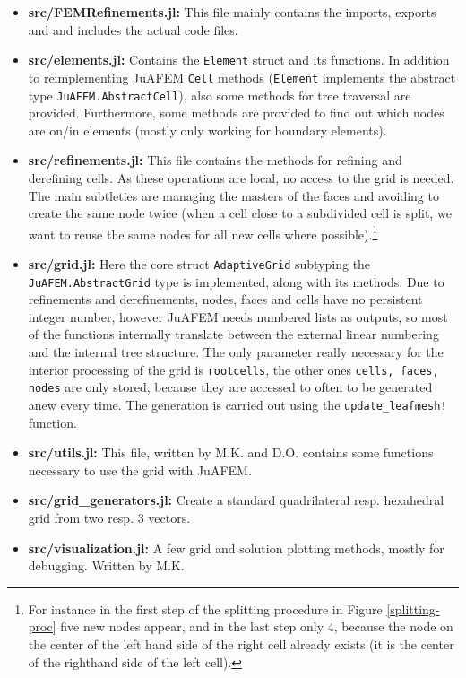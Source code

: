\documentclass{article}
\begin{document}
\begin{itemize}
    \item {\bf src/FEMRefinements.jl:} This file mainly contains the imports, exports and and includes the actual code files. 
    \item {\bf src/elements.jl:} Contains the \texttt{Element} struct and its functions. In addition to reimplementing JuAFEM \texttt{Cell} methods (\texttt{Element} implements the abstract type \texttt{JuAFEM.AbstractCell}), also some methods for tree traversal are provided. Furthermore, some methods are provided to find out which nodes are on/in elements (mostly only working for boundary elements).
    \item {\bf src/refinements.jl:} This file contains the methods for refining and derefining cells. As these operations are local, no access to the grid is needed. The main subtleties are managing the masters of the faces and avoiding to create the same node twice (when a cell close to a subdivided cell is split, we want to reuse the same nodes for all new cells where possible).\footnote{For instance in the first step of the splitting procedure in Figure \ref{splitting-proc} five new nodes appear, and in the last step only 4, because the node on the center of the left hand side of the right cell already exists (it is the center of the righthand side of the left cell).}
    \item {\bf src/grid.jl:} Here the core struct \texttt{AdaptiveGrid} subtyping the \texttt{JuAFEM.AbstractGrid} type is implemented, along with its methods. Due to refinements and derefinements, nodes, faces and cells have no persistent integer number, however JuAFEM needs numbered lists as outputs, so most of the functions internally translate between the external linear numbering and the internal tree structure. The only parameter really necessary for the interior processing of the grid is \texttt{rootcells}, the other ones \texttt{cells, faces, nodes} are only stored, because they are accessed to often to be generated anew every time. The generation is carried out using the \texttt{update\_leafmesh!} function.
    \item {\bf src/utils.jl:} This file, written by M.K. and D.O. contains some functions necessary to use the grid with JuAFEM. 
    \item {\bf src/grid\_generators.jl:} Create a standard quadrilateral resp. hexahedral grid from two resp. 3 vectors. 
    \item {\bf src/visualization.jl:} A few grid and solution plotting methods, mostly for debugging. Written by M.K.

\end{itemize}
\end{document}
